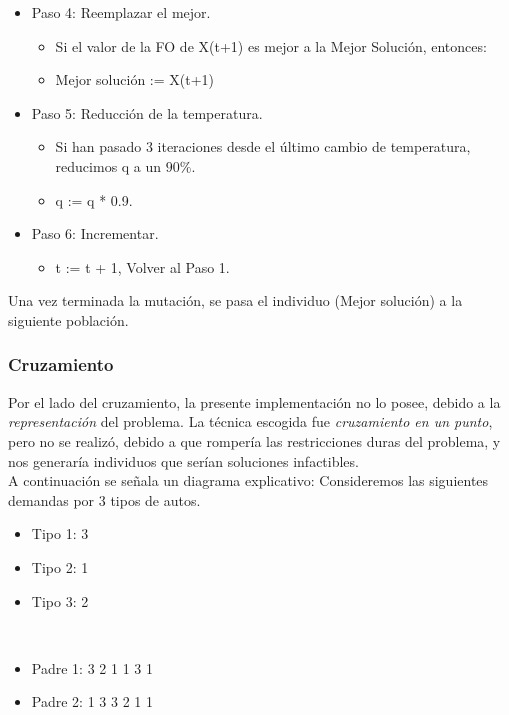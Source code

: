 \begin{itemize}
\begin{itemize}
	\end{itemize}
	\item Paso 4: Reemplazar el mejor.
	\begin{itemize}
		\item Si el valor de la FO de X(t+1) es mejor a la Mejor Solución, entonces:
		\item Mejor solución := X(t+1)
	\end{itemize}
	\item Paso 5: Reducción de la temperatura.
	\begin{itemize}
		\item Si han pasado 3 iteraciones desde el último cambio de temperatura, reducimos q a un $90\%$.
		\item q := q * 0.9.
	\end{itemize}
	\item Paso 6: Incrementar.
	\begin{itemize}
		\item t := t + 1, Volver al Paso 1. 
	\end{itemize}
\end{itemize}

Una vez terminada la mutación, se pasa el individuo (Mejor solución) a la siguiente población.

\subsubsection{Cruzamiento}
Por el lado del cruzamiento, la presente implementación no lo posee, debido a la \emph{representación} del problema.
La técnica escogida fue \emph{cruzamiento en un punto}, pero no se realizó, debido a que rompería las restricciones duras
del problema, y nos generaría individuos que serían soluciones infactibles.\\

A continuación se señala un diagrama explicativo:
Consideremos las siguientes demandas por 3 tipos de autos.\\

\begin{minipage}{0.2\textwidth}
	\begin{itemize}
		\item Tipo 1: 3
		\item Tipo 2: 1
		\item Tipo 3: 2
	\end{itemize}
\end{minipage}
\  \  
\hfill\begin{minipage}{0.4\textwidth}
	\begin{itemize}
		\item Padre 1: 3 2 1 1 3 1
		\item Padre 2: 1 3 3 2 1 1
	\end{itemize}
\end{minipage}

